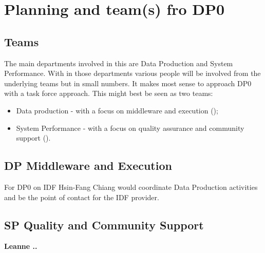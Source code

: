 \section{Planning and team(s) fro DP0} \label{sec:plan}


\subsection {Teams}

The main departments involved in this are Data Production and System Performance. With in those departments various people will be involved from the underlying teams but in small numbers. It makes most sense to approach DP0 with a task force approach. This might best be seen as two teams:

\begin{itemize}
\item Data production - with a focus on middleware and execution ();
\item System Performance - with a focus on quality assurance and community support ().
\end{itemize}

\subsection{DP Middleware and Execution}\label{sec:dp}
For DP0 on IDF Hsin-Fang Chiang would coordinate Data Production activities and be the point
of contact for the IDF provider.

\subsection{SP Quality  and Community Support} \label{sec:sp}

{\bf Leanne .. }
